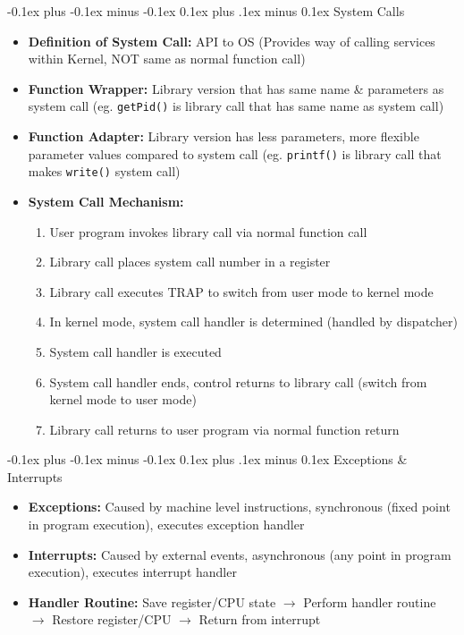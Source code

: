 \documentclass[landscape]{article}
\makeatletter
\renewcommand{\subsection}{\@startsection{subsection}{2}{0mm}%
  {-0.1ex plus -0.1ex minus -0.1ex}%
  {0.1ex plus .1ex minus 0.1ex}%
{\normalfont\scriptsize\bfseries}}
\makeatother
\begin{document}
\begin{multicols*}{5}
    \subsection{System Calls}
    \begin{itemize}
      \item \textbf{Definition of System Call:} API to OS (Provides way of calling services within Kernel, NOT same as normal function call)
      \item \textbf{Function Wrapper:} Library version that has same name \& parameters as system call (eg. \lstinline|getPid()| is library call that has same name as system call)
      \item \textbf{Function Adapter:} Library version has less parameters, more flexible parameter values compared to system call (eg. \lstinline|printf()| is library call that makes \lstinline|write()| system call)
      \item \textbf{System Call Mechanism:}
      \begin{enumerate}
        \item User program invokes library call via normal function call
        \item Library call places system call number in a register
        \item Library call executes TRAP to switch from user mode to kernel mode
        \item In kernel mode, system call handler is determined (handled by dispatcher)
        \item System call handler is executed
        \item System call handler ends, control returns to library call (switch from kernel mode to user mode)
        \item Library call returns to user program via normal function return
      \end{enumerate}
    \end{itemize}

    \subsection{Exceptions \& Interrupts}
    \begin{itemize}
      \item \textbf{Exceptions:} Caused by machine level instructions, synchronous (fixed point in program execution), executes exception handler
      \item \textbf{Interrupts:} Caused by external events, asynchronous (any point in program execution), executes interrupt handler
      \item \textbf{Handler Routine:} Save register/CPU state $\rightarrow$ Perform handler routine $\rightarrow$ Restore register/CPU $\rightarrow$ Return from interrupt
    \end{itemize}
\end{multicols*}
\end{document}

